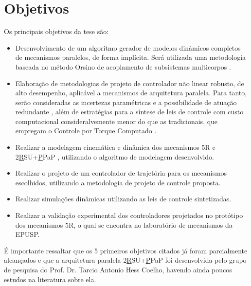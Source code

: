 \documentclass[]{politex}
\begin{document}
\section{Objetivos}\label{objetivos}


Os principais objetivos da tese s\~ao:
\begin{itemize}
\item Desenvolvimento de um algoritmo gerador de modelos dinâmicos completos de mecanismos paralelos, de forma implícita. Será utilizada uma metodologia baseada no método Orsino de acoplamento de subsistemas multicorpos \cite{23orsino}.


\item Elabora\c{c}\~ao de metodologias de projeto de controlador n\~ao linear robusto, de alto desempenho, aplicável a  mecanismos de arquitetura paralela. Para tanto, serão consideradas as incertezas param\'etricas e a possibilidade de atua\c{c}\~ao redundante \cite{Cheng},  além de estratégias para a síntese de leis de controle com custo computacional consideralvemente menor do que as tradicionais, que empregam o Controle por Torque Computado \cite{Craig, Zubizarreta}.

\item Realizar a modelagem cinemática e dinâmica dos mecanismos 5R \cite{22orsino} e 2\underline{R}SU+\underline{P}PaP \cite{Rynaldo, Kumazawa}, utilizando o algoritmo de modelagem desenvolvido.

\item Realizar o projeto de um controlador de trajetória para os mecanismos escolhidos, utilizando a metodologia de projeto de controle proposta.

\item Realizar simula\c{c}\~oes dinâmicas utilizando as leis de controle sintetizadas.

\item Realizar a validação experimental dos controladores projetados no protótipo dos mecanismos 5R, o qual se encontra no laboratório de mecanismos da EPUSP.
\end{itemize}

É importante ressaltar que os 5 primeiros objetivos citados já foram parcialmente alcançados e que a arquitetura paralela 2\underline{R}SU+\underline{P}PaP foi desenvolvida pelo grupo de pesquisa do Prof. Dr. Tarcio Antonio Hess Coelho, havendo ainda poucos estudos na literatura sobre ela. %
\end{document}
